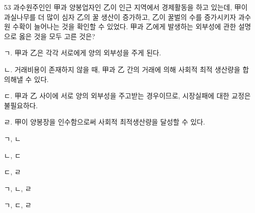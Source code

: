\begin{question}{53}
과수원주인인 甲과 양봉업자인 乙이 인근 지역에서 경제활동을 하고 있는데, 甲이 과실나무를 더 많이 심자 乙의 꿀 생산이 증가하고, 乙이 꿀벌의 수를 증가시키자 과수원 수확이 늘어나는 것을 확인할 수 있었다. 甲과 乙에게 발생하는 외부성에 관한 설명으로 옳은 것을 모두 고른 것은?
\begin{framedtext}
ㄱ. 甲과 乙은 각각 서로에게 양의 외부성을 주게 된다. \par
ㄴ. 거래비용이 존재하지 않을 때, 甲과 乙 간의 거래에 의해 사회적 최적 생산량을 합의해낼 수 있다. \par
ㄷ. 甲과 乙 사이에 서로 양의 외부성을 주고받는 경우이므로, 시장실패에 대한 교정은 불필요하다. \par
ㄹ. 甲이 양봉장을 인수함으로써 사회적 최적생산량을 달성할 수 있다. \par
\end{framedtext}
\begin{choices}
  \item ㄱ, ㄴ
  \item ㄴ, ㄷ
  \item ㄷ, ㄹ
  \item ㄱ, ㄴ, ㄹ
  \item ㄱ, ㄷ, ㄹ
\end{choices}
\end{question}
